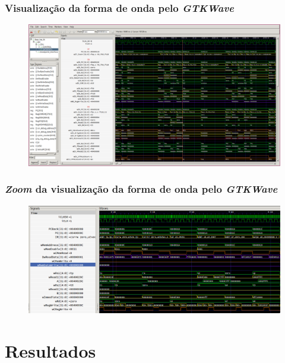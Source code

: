 \documentclass[aspectratio=169]{beamer}
\begin{document}
    \begin{frame}
        \frametitle{Visualização da forma de onda pelo \textit{GTKWave}}
        \vfill
        \begin{figure}[H]
        \centering
            \includegraphics[width=.9\textwidth,height=.85\textheight,keepaspectratio]
            {../images/gtkwave/random.png}
        \end{figure}
        \vfill
    \end{frame}

    \begin{frame}
        \frametitle{\textit{Zoom} da visualização da forma de onda pelo \textit{GTKWave}}
        \vfill
        \begin{figure}[H]
        \centering
            \includegraphics[width=.9\textwidth,height=.85\textheight,keepaspectratio]
            {../images/gtkwave/gtkwave_zoom.png}
        \end{figure}
        \vfill
    \end{frame}


\section{Resultados}
\end{document}
